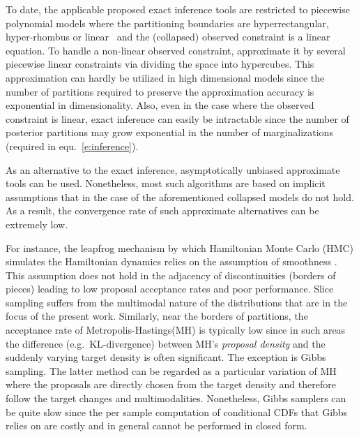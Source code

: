To date, the applicable proposed exact inference tools are restricted to piecewise polynomial models where the partitioning boundaries are  
hyperrectangular, hyper-rhombus or linear~\cite{shenoy2011inference,shenoy2012two,Sanner:12}
and the (collapsed) observed constraint is a linear equation.
To handle a non-linear observed constraint,  
\cite{cobb2005nonlinear} approximate it by several piecewise linear constraints via dividing the space into hypercubes. This approximation can hardly be utilized in high dimensional models since the number of partitions required to preserve the approximation accuracy is exponential in dimensionality.
Also, even in the case where the observed constraint is linear, exact inference can easily be intractable since the number of posterior partitions may grow exponential in the number of marginalizations (required in equ.~\ref{e:inference}). 

As an alternative to the exact inference, asymptotically unbiased approximate tools can be used. 
Nonetheless, most such algorithms are based on implicit assumptions that in the case of the aforementioned collapsed models do not hold.
As a result, the convergence rate of such approximate alternatives can be extremely low.  


For instance, the leapfrog mechanism by which Hamiltonian Monte
Carlo (HMC) simulates the Hamiltonian dynamics relies on the
assumption of smoothness \cite{neal2011mcmc}.  This assumption does
not hold in the adjacency of discontinuities (borders of pieces)
leading to low proposal acceptance rates and poor performance.  Slice
sampling suffers from the multimodal nature of the distributions that
are in the focus of the present work. Similarly, near the borders of
partitions, the acceptance rate of Metropolis-Hastings(MH) is
typically low since in such areas the difference (e.g.\ KL-divergence)
between MH’s \emph{proposal density} and the suddenly varying
target density is often significant.  The exception is Gibbs
sampling. The latter method can be regarded as a particular variation
of MH where the proposals are directly chosen from the target
density and therefore follow the target changes and
multimodalities.  Nonetheless, Gibbs samplers can be quite slow since
the per sample computation of conditional CDFs that Gibbs relies on are
costly and in general cannot be performed in closed form.

